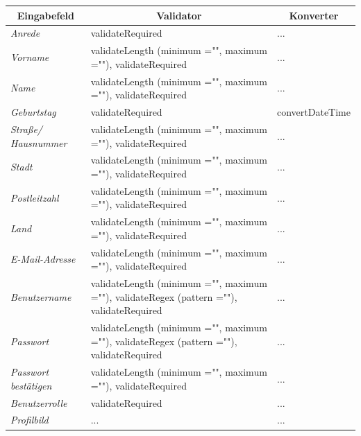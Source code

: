 \begin{itemize}
\begin{center}
\begin{longtable}{|p{3cm} |p{8cm} | p{5cm}|}
						\hline \multicolumn{1}{|c|}{\textbf{Eingabefeld}} & \multicolumn{1}{|c|}{\textbf{Validator}} & \multicolumn{1}{|c|}{\textbf{Konverter}} \\ \hline
						\endfirsthead
						\hline
						\endlastfoot
						\textit{Anrede} & validateRequired & ... \\ \hline
						\textit{Vorname} & validateLength (minimum ="", maximum =""), validateRequired & ... \\ \hline
						\textit{Name} & validateLength (minimum ="", maximum =""), validateRequired & ...  \\ \hline
						\textit{Geburtstag} & validateRequired & convertDateTime  \\ \hline
						\textit{Straße/ Hausnummer} & validateLength (minimum ="", maximum =""), validateRequired & ... \\ \hline
						\textit{Stadt} & validateLength (minimum ="", maximum =""), validateRequired & ...  \\ \hline
						\textit{Postleitzahl} & validateLength (minimum ="", maximum =""), validateRequired & ... \\ \hline
						\textit{Land} & validateLength (minimum ="", maximum =""), validateRequired & ...  \\ \hline
						\textit{E-Mail-Adresse} & validateLength (minimum ="", maximum =""), validateRequired & ... \\ \hline
						\textit{Benutzername} & validateLength (minimum ="", maximum =""), validateRegex (pattern =""), validateRequired  & ... \\ \hline
						\textit{Passwort} & validateLength (minimum ="", maximum =""), validateRegex (pattern =""), validateRequired & ...  \\ \hline
						\textit{Passwort bestätigen} & validateLength (minimum ="", maximum =""), validateRequired & ... \\ \hline
						\textit{Benutzerrolle} & validateRequired & ... \\ \hline
						\textit{Profilbild} & ... & ... \\ \hline
					\end{longtable}
				\end{center}
				

\end{itemize}
